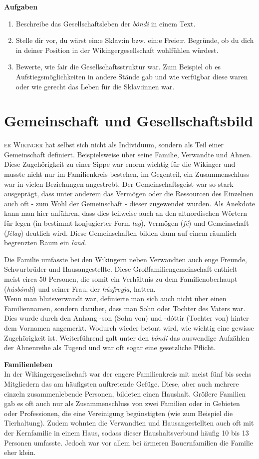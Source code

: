 \documentclass[12pt,a4paper,ngerman,openany]{book}
\newcommand{\flettrine}[2]{\lettrine[lines=2, depth=0, loversize=0.25, nindent=0.69pt, lraise=0.15]{\initfamily{#1}}{#2}}
\newcommand*\initfamily{\usefont{U}{GotIn}{xl}{n}}
\newcommand{\aufgaben}[1]{
  \begin{tcolorbox}
    \textbf{Aufgaben}
    \begin{enumerate}
      #1
    \end{enumerate}
  \end{tcolorbox}
} %
\begin{document}
\aufgaben{
  \item Beschreibe das Gesellschaftsleben der \textit{bóndi} in einem Text.
  \item Stelle dir vor, du wärst ein:e Sklav:in bzw. ein:e Freie:r. Begründe, ob du dich in deiner Position in der Wikingergesellschaft wohlfühlen würdest.
  \item Bewerte, wie fair die Gesellschaftsstruktur war. Zum Beispiel ob es Aufstiegsmöglichkeiten in andere Stände gab und wie verfügbar diese waren oder wie gerecht das Leben für die Sklav:innen war.
}

\newpage

\section{Gemeinschaft und Gesellschaftsbild}
\flettrine{D}{er Wikinger} hat selbst sich nicht als Individuum, sondern als Teil einer Gemeinschaft definiert. Beispielsweise über seine Familie, Verwandte und Ahnen. Diese Zugehörigkeit zu einer Sippe war enorm wichtig für die Wikinger und musste nicht nur im Familienkreis bestehen, im Gegenteil, ein Zusammenschluss war in vielen Beziehungen angestrebt. Der Gemeinschaftsgeist war so stark ausgeprägt, dass unter anderem das Vermögen oder die Ressourcen des Einzelnen auch oft - zum Wohl der Gemeinschaft - dieser zugewendet wurden. Als Anekdote kann man hier anführen, dass dies teilweise auch an den altnordischen Wörtern für legen (in bestimmt konjugierter Form \textit{lag}), Vermögen (\textit{fé}) und Gemeinschaft (\textit{félag}) deutlich wird. Diese Gemeinschaften bilden dann auf einem räumlich begrenzten Raum ein \textit{land}.

Die Familie umfasste bei den Wikingern neben Verwandten auch enge Freunde,
Schwurbrüder und Hausangestellte. Diese Großfamiliengemeinschaft enthielt meist circa 50 Personen, die somit ein Verhältnis zu dem Familienoberhaupt (\textit{húsbóndi}) und seiner Frau, der \textit{húsfreyja}, hatten.\\
Wenn man blutsverwandt war, definierte man sich auch nicht über einen Familiennamen, sondern darüber, dass man Sohn oder Tochter des Vaters war. Dies wurde durch den Anhang -son (Sohn von) und -dóttir (Tochter von) hinter dem Vornamen angemerkt.
Wodurch wieder betont wird, wie wichtig eine gewisse \glqq Zugehörigkeit\grqq{} ist. Weiterführend galt unter den \textit{bóndi} das auswendige Aufzählen der Ahnenreihe als Tugend und war oft sogar eine gesetzliche Pflicht.

\textbf{Familienleben}\\
In der Wikingergesellschaft war der engere Familienkreis mit meist fünf bis sechs Mitgliedern das am häufigsten auftretende Gefüge. Diese, aber auch mehrere einzeln zusammenlebende Personen, bildeten einen Haushalt. Größere Familien gab es oft auch nur als Zusammenschluss von zwei Familien oder in Gebieten oder Professionen, die eine Vereinigung begünstigten (wie zum Beispiel die Tierhaltung). Zudem wohnten die Verwandten und Hausangestellten auch oft mit der Kernfamilie in einem Haus, sodass dieser Haushaltsverbund häufig 10 bis 13 Personen umfasste. Jedoch war vor allem bei ärmeren Bauernfamilien die Familie eher klein.
\end{document}
